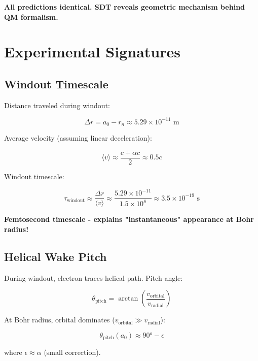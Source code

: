\documentclass{article}
\begin{document}
\textbf{All predictions identical. SDT reveals geometric mechanism behind QM formalism.}

\section{Experimental Signatures}

\subsection{Windout Timescale}

Distance traveled during windout:

\begin{equation}
\Delta r = a_0 - r_n \approx 5.29 \times 10^{-11} \text{ m}
\end{equation}

Average velocity (assuming linear deceleration):

\begin{equation}
\langle v \rangle \approx \frac{c + \alpha c}{2} \approx 0.5c
\end{equation}

Windout timescale:

\begin{equation}
\tau_{\text{windout}} \approx \frac{\Delta r}{\langle v \rangle} \approx \frac{5.29 \times 10^{-11}}{1.5 \times 10^8} \approx 3.5 \times 10^{-19} \text{ s}
\end{equation}

\textbf{Femtosecond timescale - explains "instantaneous" appearance at Bohr radius!}

\subsection{Helical Wake Pitch}

During windout, electron traces helical path. Pitch angle:

\begin{equation}
\theta_{\text{pitch}} = \arctan\left(\frac{v_{\text{orbital}}}{v_{\text{radial}}}\right)
\end{equation}

At Bohr radius, orbital dominates ($v_{\text{orbital}} \gg v_{\text{radial}}$):

\begin{equation}
\theta_{\text{pitch}}(a_0) \approx 90° - \epsilon
\end{equation}

where $\epsilon \approx \alpha$ (small correction).
\end{document}
